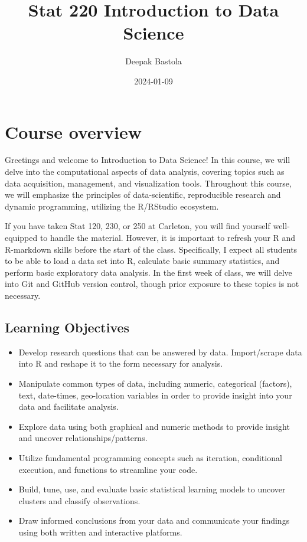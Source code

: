 \documentclass[
]{book}
\title{Stat 220 Introduction to Data Science}
\author{Deepak Bastola}
\date{2024-01-09}
\providecommand{\tightlist}{%
  \setlength{\itemsep}{0pt}\setlength{\parskip}{0pt}}
\begin{document}
\maketitle

{
\setcounter{tocdepth}{1}
\tableofcontents
}
\hypertarget{course-overview}{%
\chapter*{Course overview}\label{course-overview}}

Greetings and welcome to Introduction to Data Science! In this course, we will delve into the computational aspects of data analysis, covering topics such as data acquisition, management, and visualization tools. Throughout this course, we will emphasize the principles of data-scientific, reproducible research and dynamic programming, utilizing the R/RStudio ecosystem.

If you have taken Stat 120, 230, or 250 at Carleton, you will find yourself well-equipped to handle the material. However, it is important to refresh your R and R-markdown skills before the start of the class. Specifically, I expect all students to be able to load a data set into R, calculate basic summary statistics, and perform basic exploratory data analysis. In the first week of class, we will delve into Git and GitHub version control, though prior exposure to these topics is not necessary.

\hypertarget{learning-objectives}{%
\section{Learning Objectives}\label{learning-objectives}}

\begin{itemize}
\tightlist
\item
  Develop research questions that can be answered by data. Import/scrape data into R and reshape it to the form necessary for analysis.
\item
  Manipulate common types of data, including numeric, categorical (factors), text, date-times, geo-location variables in order to provide insight into your data and facilitate analysis.
\item
  Explore data using both graphical and numeric methods to provide insight and uncover relationships/patterns.
\item
  Utilize fundamental programming concepts such as iteration, conditional execution, and functions to streamline your code.
\item
  Build, tune, use, and evaluate basic statistical learning models to uncover clusters and classify observations.
\item
  Draw informed conclusions from your data and communicate your findings using both written and interactive platforms.
\end{itemize}
\end{document}
